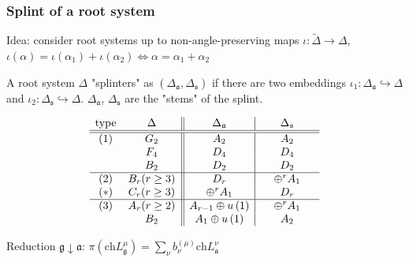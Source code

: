 \documentclass[pdftex]{beamer}
\newcommand{\gf}{\mathfrak{g}}
\newcommand{\af}{\mathfrak{a}}
\newcommand{\sfr}{\mathfrak{s}}
\theoremstyle{definition} \newtheorem{Def}{Definition}
\begin{document}
\begin{frame}
  \frametitle{Splint of a root system}
  Idea: consider root systems up to non-angle-preserving maps $\iota:\tilde\Delta\to \Delta$, $\iota(\alpha)=\iota(\alpha_{1})+\iota(\alpha_{2})\Leftrightarrow \alpha=\alpha_{1}+\alpha_{2}$

  A root system $\Delta$ "splinters"{ }as $\left(\Delta_{\af},\Delta_{\sfr}\right)$ if there are two embeddings $\iota_1:\Delta_{\af}\hookrightarrow\Delta$ and $\iota_2:\Delta_{\sfr}\hookrightarrow\Delta$.      $\Delta_{\af}$, $\Delta_{\sfr}$ are the "stems"{ }of the splint.


  \begin{equation*}
    \begin{array}{cc||c|c}
      \hbox{type} & \hspace{0.25in}\Delta \hspace{0.25in} & \hspace{0.25in}\Delta
      _{\frak{a}}\hspace{0.25in} & \hspace{0.25in}\Delta _{\frak{s}}\hspace{0.25in}
      \\ \hline\hline
      \hbox{(1)} & G_{2} & A_{2} & A_{2} \\
      & F_{4} & D_{4} & D_{4} \\ 
      & B_{2} & D_{2} & D_{2} \\ \hline
      \hbox{(2)} & B_{r}(r\geq 3) & D_{r} & \oplus ^{r}A_{1} \\
      (*)& C_{r}(r\geq 3) & \oplus ^{r}A_{1} &  D_{r} \\ \hline
      \hbox{(3)} & A_{r}(r\geq 2) & A_{r-1}\oplus u\left( 1\right)  & \oplus
      ^{r}A_{1} \\
      & B_{2} & A_{1}\oplus u\left( 1\right)  & A_{2}
    \end{array}
    \label{tb2}
  \end{equation*}

  Reduction $\gf\downarrow \af$: \quad$\pi\left(\mathrm{ch}L^{\mu}_{\gf}\right)=\sum_{\nu} b^{(\mu)}_{\nu} \mathrm{ch}L^{\nu}_{\af}$
\end{frame}
\end{document}

